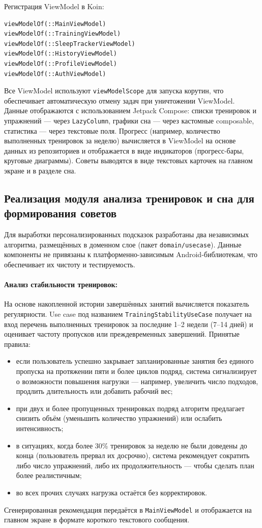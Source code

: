 Регистрация ViewModel в Koin:
\begin{verbatim}
viewModelOf(::MainViewModel)
viewModelOf(::TrainingViewModel)
viewModelOf(::SleepTrackerViewModel)
viewModelOf(::HistoryViewModel)
viewModelOf(::ProfileViewModel)
viewModelOf(::AuthViewModel)
\end{verbatim}

Все ViewModel используют \texttt{viewModelScope} для запуска корутин, что обеспечивает автоматическую отмену задач при уничтожении ViewModel. Данные отображаются с использованием Jetpack Compose: списки тренировок и упражнений — через \texttt{LazyColumn}, графики сна — через кастомные composable, статистика — через текстовые поля. Прогресс (например, количество выполненных тренировок за неделю) вычисляется в ViewModel на основе данных из репозиториев и отображается в виде индикаторов (прогресс-бары, круговые диаграммы). Советы выводятся в виде текстовых карточек на главном экране и в разделе сна.

\subsection{Реализация модуля анализа тренировок и сна для формирования советов}

Для выработки персонализированных подсказок разработаны два независимых алгоритма, размещённых в доменном слое (пакет \texttt{domain/usecase}). Данные компоненты не привязаны к платформенно-зависимым Android-библиотекам, что обеспечивает их чистоту и тестируемость.

\paragraph{Анализ стабильности тренировок:}
На основе накопленной истории завершённых занятий вычисляется показатель регулярности. Use case под названием \texttt{TrainingStabilityUseCase} получает на вход перечень выполненных тренировок за последние 1–2 недели (7–14 дней) и оценивает частоту пропусков или преждевременных завершений. Принятые правила:
\begin{itemize}
    \item если пользователь успешно закрывает запланированные занятия без единого пропуска на протяжении пяти и более циклов подряд, система сигнализирует о возможности повышения нагрузки — например, увеличить число подходов, продлить длительность или добавить рабочий вес;
    \item при двух и более пропущенных тренировках подряд алгоритм предлагает снизить объём (уменьшить количество упражнений) или ослабить интенсивность;
    \item в ситуациях, когда более 30\% тренировок за неделю не были доведены до конца (пользователь прервал их досрочно), система рекомендует сократить либо число упражнений, либо их продолжительность — чтобы сделать план более реалистичным;
    \item во всех прочих случаях нагрузка остаётся без корректировок.
\end{itemize}
Сгенерированная рекомендация передаётся в \texttt{MainViewModel} и отображается на главном экране в формате короткого текстового сообщения.


